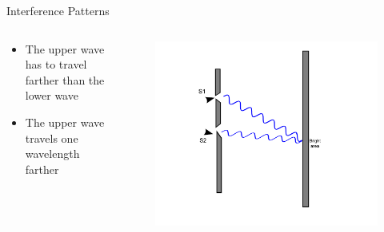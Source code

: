 \begin{frame}{Interference Patterns}
    \vspace{-1cm}
    \begin{columns}[c, onlytextwidth]
        \begin{column}{0.5\textwidth}
            \begin{itemize}
                \item The upper wave has to travel farther than the lower wave
                \item The upper wave travels one wavelength farther
            \end{itemize}
        \end{column}\begin{column}{0.5\textwidth}
            \begin{figure}
                \centering{}
                \includegraphics[height=1\textheight, trim={2cm  0 2cm 0},clip]{images/bright2.pdf}
            \end{figure}
        \end{column}
    \end{columns}
\end{frame}

